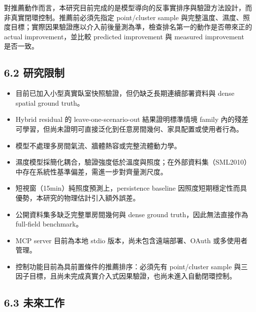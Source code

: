 \documentclass[12pt,a4paper]{article}
\begin{document}
對推薦動作而言，本研究目前完成的是模型導向的反事實排序與驗證方法設計，而非真實閉環控制。推薦前必須先指定 point/cluster sample 與完整溫度、濕度、照度目標；實際因果驗證應以介入前後量測為準，檢查排名第一的動作是否帶來正的 actual improvement，並比較 predicted improvement 與 measured improvement 是否一致。


\subsection*{6.2 研究限制}

\begin{itemize}
\item 目前已加入小型真實臥室快照驗證，但仍缺乏長期連續部署資料與 dense spatial ground truth。
\item Hybrid residual 的 leave-one-scenario-out 結果證明標準情境 family 內的殘差可學習，但尚未證明可直接泛化到任意房間幾何、家具配置或使用者行為。
\item 模型不處理多房間氣流、牆體熱容或完整流體動力學。
\item 濕度模型採簡化耦合，驗證強度低於溫度與照度；在外部資料集（SML2010）中存在系統性基準偏差，需進一步對齊量測尺度。
\item 短視窗（15min）純照度預測上，persistence baseline 因照度短期穩定性而具優勢，本研究的物理估計引入額外誤差。
\item 公開資料集多缺乏完整單房間幾何與 dense ground truth，因此無法直接作為 full-field benchmark。
\item MCP server 目前為本地 stdio 版本，尚未包含遠端部署、OAuth 或多使用者管理。
\item 控制功能目前為具前置條件的推薦排序：必須先有 point/cluster sample 與三因子目標，且尚未完成真實介入式因果驗證，也尚未進入自動閉環控制。
\end{itemize}

\subsection*{6.3 未來工作}
\end{document}
